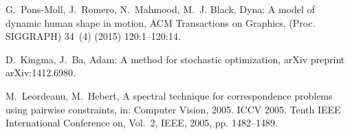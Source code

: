 \documentclass[5p,twocolumn,10pt,times]{elsarticle}
\begin{document}
\begin{thebibliography}{10}
G.~Pons-Moll, J.~Romero, N.~Mahmood, M.~J. Black, Dyna: A model of dynamic
  human shape in motion, ACM Transactions on Graphics, (Proc. SIGGRAPH) 34~(4)
  (2015) 120:1--120:14.

D.~Kingma, J.~Ba, Adam: A method for stochastic optimization, arXiv preprint
  arXiv:1412.6980.

M.~Leordeanu, M.~Hebert, A spectral technique for correspondence problems using
  pairwise constraints, in: Computer Vision, 2005. ICCV 2005. Tenth IEEE
  International Conference on, Vol.~2, IEEE, 2005, pp. 1482--1489.

\end{thebibliography}

%
\end{document}
